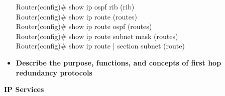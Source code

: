 \documentclass{article}
\begin{document}
\begin{itemize}
  		Router(config)\# show ip ospf rib (rib)\\
  		
  		Router(config)\# show ip route (routes)\\
  		Router(config)\# show ip route ospf (routes)\\
  		Router(config)\# show ip route subnet mask (routes)\\
  		Router(config)\# show ip route | section subnet (route)
  \item \textbf{Describe the purpose, functions, and concepts of first hop redundancy protocols}\\
\end{itemize}



\begin{flushleft}\textbf{IP Services}\end{flushleft}
\end{document}
